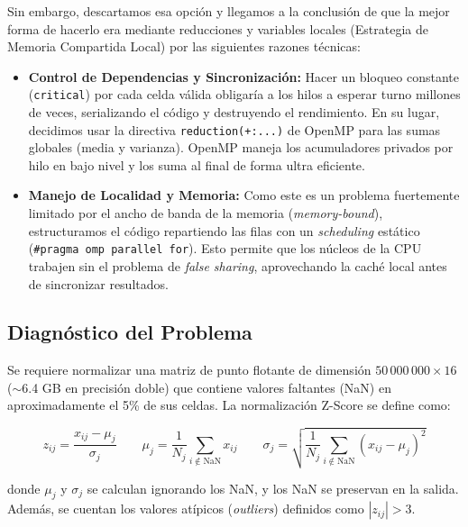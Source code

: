 \documentclass[10pt,a4paper]{article}
\begin{document}
Sin embargo, descartamos esa opci\'on y llegamos a la conclusi\'on de que la
mejor forma de hacerlo era mediante reducciones y variables locales (Estrategia
de Memoria Compartida Local) por las siguientes razones t\'ecnicas:

\begin{itemize}
    \item \textbf{Control de Dependencias y Sincronizaci\'on:} Hacer un bloqueo
        constante (\texttt{critical}) por cada celda v\'alida obligar\'ia a los
        hilos a esperar turno millones de veces, serializando el c\'odigo y
        destruyendo el rendimiento. En su lugar, decidimos usar la directiva
        \texttt{reduction(+:...)} de OpenMP para las sumas globales (media y
        varianza). OpenMP maneja los acumuladores privados por hilo en bajo
        nivel y los suma al final de forma ultra eficiente.
    \item \textbf{Manejo de Localidad y Memoria:} Como este es un problema
        fuertemente limitado por el ancho de banda de la memoria
        (\emph{memory-bound}), estructuramos el c\'odigo repartiendo las filas
        con un \emph{scheduling} est\'atico (\texttt{\#pragma omp parallel for}).
        Esto permite que los n\'ucleos de la CPU trabajen sin el problema de
        \emph{false sharing}, aprovechando la cach\'e local antes de sincronizar
        resultados.
\end{itemize}

\subsection{Diagn\'ostico del Problema}

Se requiere normalizar una matriz de punto flotante de dimensi\'on
$50\,000\,000 \times 16$ ($\sim$6.4 GB en precisi\'on doble) que contiene
valores faltantes (NaN) en aproximadamente el 5\% de sus celdas. La
normalizaci\'on Z-Score se define como:

\[
z_{ij} = \frac{x_{ij} - \mu_j}{\sigma_j}
\qquad
\mu_j = \frac{1}{N_j}\sum_{i \notin \text{NaN}} x_{ij}
\qquad
\sigma_j = \sqrt{\frac{1}{N_j}\sum_{i \notin \text{NaN}} (x_{ij} - \mu_j)^2}
\]

donde $\mu_j$ y $\sigma_j$ se calculan ignorando los NaN, y los NaN se
preservan en la salida. Adem\'as, se cuentan los valores at\'ipicos
(\emph{outliers}) definidos como $|z_{ij}| > 3$.
\end{document}
